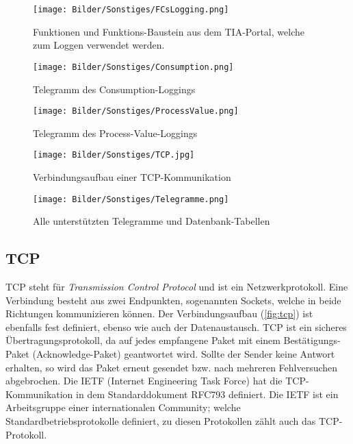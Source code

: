\begin{figure}
\centering
 \texttt{[image: Bilder/Sonstiges/FCsLogging.png]}
 \caption[Funktionen und Funktions-Baustein aus dem TIA-Portal]{Funktionen und Funktions-Baustein aus dem TIA-Portal, welche zum Loggen verwendet werden.}
 \label{fig:fcs}
\end{figure}

\begin{figure}
\centering
 \texttt{[image: Bilder/Sonstiges/Consumption.png]}
 \caption[Telegramm des Consumption-Loggings]{Telegramm des Consumption-Loggings}
 \label{fig:Consumption}
\end{figure}

\begin{figure}
\centering
 \texttt{[image: Bilder/Sonstiges/ProcessValue.png]}
 \caption[Telegramm des Process-Value-Loggings]{Telegramm des Process-Value-Loggings}
 \label{fig:ProcessValue}
\end{figure}

\begin{figure}
\centering
 \texttt{[image: Bilder/Sonstiges/TCP.jpg]}
 \caption[Verbindungsaufbau einer TCP-Kommunikation]{Verbindungsaufbau einer TCP-Kommunikation \cite{tcp-verbindungsaufbau}}
 \label{fig:tcp}
\end{figure}

\begin{figure}
\centering
 \texttt{[image: Bilder/Sonstiges/Telegramme.png]}
 \caption[Alle unterstützten Telegramme und Datenbank-Tabellen]{Alle unterstützten Telegramme und Datenbank-Tabellen}
 \label{fig:telegramme}
\end{figure}



\subsection{TCP}
TCP steht für \textit{Transmission Control Protocol} und ist ein Netzwerkprotokoll. Eine Verbindung besteht aus zwei Endpunkten, sogenannten Sockets, welche in beide Richtungen kommunizieren können. Der Verbindungsaufbau (\autoref{fig:tcp}) ist ebenfalls fest definiert, ebenso wie auch der Datenaustausch. TCP ist ein sicheres Übertragungsprotokoll, da auf jedes empfangene Paket mit einem Bestätigungs-Paket (Acknowledge-Paket) geantwortet wird. Sollte der Sender keine Antwort erhalten, so wird das Paket erneut gesendet bzw. nach mehreren Fehlversuchen abgebrochen. Die IETF (Internet Engineering Task Force) hat die TCP-Kommunikation in dem Standarddokument RFC793 \cite{tcp-rfc} definiert. Die IETF ist ein Arbeitsgruppe einer internationalen Community; welche Standardbetriebsprotokolle definiert, zu diesen Protokollen zählt auch das TCP-Protokoll.
\ \\


